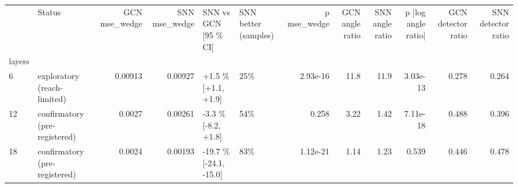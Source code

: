 \begin{tabular}{llrrllrrrrrr}
\toprule
 & Status & GCN mse\_wedge & SNN mse\_wedge & SNN vs GCN [95 \% CI] & SNN better (samples) & p mse\_wedge & GCN angle ratio & SNN angle ratio & p |log angle ratio| & GCN detector ratio & SNN detector ratio \\
layers &  &  &  &  &  &  &  &  &  &  &  \\
\midrule
6 & exploratory (reach-limited) & 0.00913 & 0.00927 & +1.5 \% [+1.1, +1.9] & 25\% & 2.93e-16 & 11.8 & 11.9 & 3.03e-13 & 0.278 & 0.264 \\
12 & confirmatory (pre-registered) & 0.0027 & 0.00261 & -3.3 \% [-8.2, +1.8] & 54\% & 0.258 & 3.22 & 1.42 & 7.11e-18 & 0.488 & 0.396 \\
18 & confirmatory (pre-registered) & 0.0024 & 0.00193 & -19.7 \% [-24.1, -15.0] & 83\% & 1.12e-21 & 1.14 & 1.23 & 0.539 & 0.446 & 0.478 \\
\bottomrule
\end{tabular}
